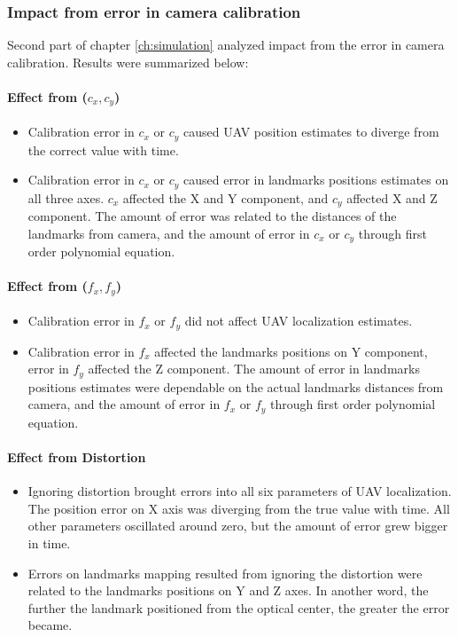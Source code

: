 \subsubsection{Impact from error in camera calibration} 
Second part of chapter \ref{ch:simulation} analyzed impact from the
error in camera calibration. Results were summarized below:

\paragraph{Effect from ($c_x, c_y$)}
\begin{itemize}
  \item Calibration error in $c_x$ or $c_y$ caused UAV position estimates to diverge from the correct value with time.
  \item Calibration error in $c_x$ or $c_y$ caused error in landmarks
  positions estimates on all three axes. $c_x$ affected the X and Y
  component, and $c_y$ affected X and Z component. The amount of error
  was related to the distances of the landmarks from camera, and the
  amount of error in $c_x$ or $c_y$ through first order polynomial equation.
\end{itemize}

\paragraph{Effect from ($f_x, f_y$)}
\begin{itemize}
  \item Calibration error in $f_x$ or $f_y$ did not affect UAV
  localization estimates.
  \item Calibration error in $f_x$ affected the landmarks positions on
  Y component, error in $f_y$ affected the Z component. The amount of
  error in landmarks positions estimates were dependable on the actual
  landmarks distances from camera, and the amount of error in $f_x$
  or $f_y$ through first order polynomial equation.
\end{itemize}

\paragraph{Effect from Distortion}
\begin{itemize}
  \item Ignoring distortion brought errors into all six parameters of
  UAV localization. The position error on X axis was diverging
  from the true value with time. All other parameters oscillated around
  zero, but the amount of error grew bigger in time.
  \item Errors on landmarks mapping resulted from ignoring the
  distortion were related to the landmarks positions on Y and Z axes.
  In another word, the further the landmark positioned from the
  optical center, the greater the error became.
\end{itemize}

